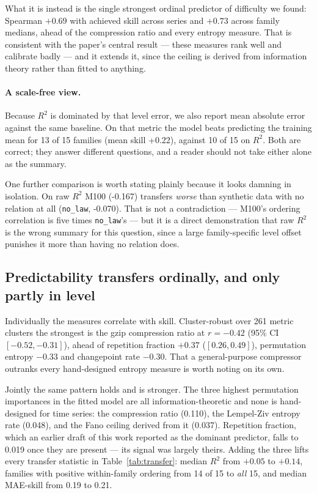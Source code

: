 \documentclass[11pt,a4paper]{article}
\newcommand{\num}[1]{#1}
\begin{document}
What it is instead is the single strongest ordinal predictor of difficulty we
found: Spearman \(+0.69\) with achieved skill across series and \(+0.73\)
across family medians, ahead of the compression ratio and every entropy measure.
That is consistent with the paper's central result --- these measures rank well
and calibrate badly --- and it extends it, since the ceiling is derived from
information theory rather than fitted to anything.

\paragraph{A scale-free view.} Because \(R^2\) is dominated by that level
error, we also report mean absolute error against the same baseline. On that
metric the model beats predicting the training mean for \num{13} of \num{15}
families (mean skill \num{+0.22}), against \num{10} of \num{15} on \(R^2\).
Both are correct; they answer different questions, and a reader should not take
either alone as the summary.

One further comparison is worth stating plainly because it looks damning in
isolation. On raw \(R^2\) M100 (\num{-0.167}) transfers \emph{worse} than
synthetic data with no relation at all (\texttt{no\_law}, \num{-0.070}). That
is not a contradiction --- M100's ordering correlation is five times
\texttt{no\_law}'s --- but it is a direct demonstration that raw \(R^2\) is the
wrong summary for this question, since a large family-specific level offset
punishes it more than having no relation does.

\subsection{Predictability transfers ordinally, and only partly in level}
\label{sec:linking}

Individually the measures correlate with skill. Cluster-robust over \num{261}
metric clusters the strongest is the gzip compression ratio at \(r=-0.42\)
(95\% CI \([-0.52,-0.31]\)), ahead of repetition fraction \(+0.37\)
(\([0.26,0.49]\)), permutation entropy \(-0.33\) and changepoint rate
\(-0.30\). That a general-purpose compressor outranks every hand-designed
entropy measure is worth noting on its own.

Jointly the same pattern holds and is stronger. The three highest permutation
importances in the fitted model are all information-theoretic and none is
hand-designed for time series: the compression ratio (\num{0.110}), the
Lempel-Ziv entropy rate (\num{0.048}), and the Fano ceiling derived from it
(\num{0.037}). Repetition fraction, which an earlier draft of this work reported
as the dominant predictor, falls to \num{0.019} once they are present --- its
signal was largely theirs. Adding the three lifts every transfer statistic in
Table~\ref{tab:transfer}: median \(R^2\) from \(+0.05\) to \(+0.14\), families
with positive within-family ordering from \num{14} of \num{15} to \emph{all}
\num{15}, and median MAE-skill from \num{0.19} to \num{0.21}.
\end{document}
